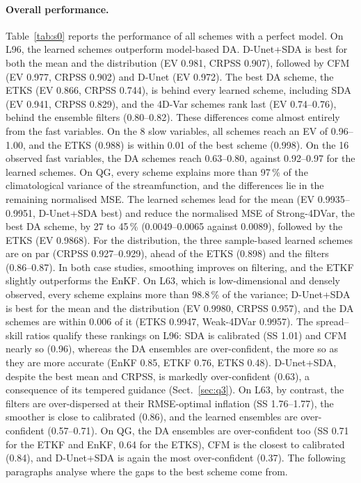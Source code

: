\paragraph{Overall performance.}
Table~\ref{tab:s0} reports the performance of all schemes with a perfect model. On L96,
the learned schemes outperform model-based DA. D-Unet+SDA is best for both the mean and
the distribution (EV 0.981, CRPSS 0.907), followed by CFM (EV 0.977, CRPSS 0.902) and
D-Unet (EV 0.972). The best DA scheme, the ETKS (EV 0.866, CRPSS 0.744), is behind
every learned scheme, including SDA (EV 0.941, CRPSS 0.829), and the 4D-Var schemes rank
last (EV 0.74--0.76), behind the ensemble filters (0.80--0.82). These differences come
almost entirely from the fast variables. On the 8 slow variables, all schemes reach an
EV of 0.96--1.00, and the ETKS (0.988) is within 0.01 of the best scheme (0.998). On the
16 observed fast variables, the DA schemes reach 0.63--0.80, against 0.92--0.97 for the
learned schemes. On
QG, every scheme explains more than 97\,\% of the climatological variance of the
streamfunction, and the differences lie in the remaining normalised MSE. The learned schemes
lead for the mean (EV 0.9935--0.9951, D-Unet+SDA best) and reduce the normalised MSE of
Strong-4DVar, the best DA scheme, by 27 to 45\,\% (0.0049--0.0065 against 0.0089), followed by
the ETKS (EV 0.9868). For the distribution, the three sample-based learned schemes are on par (CRPSS
0.927--0.929), ahead of the ETKS (0.898) and the filters (0.86--0.87). In both case studies, smoothing improves on
filtering, and the ETKF slightly outperforms the EnKF. On L63, which is low-dimensional and
densely observed, every scheme explains more than 98.8\,\% of the variance; D-Unet+SDA is best
for the mean and the distribution (EV 0.9980, CRPSS 0.957), and the DA schemes are within 0.006
of it (ETKS 0.9947, Weak-4DVar 0.9957). The spread--skill ratios qualify these rankings on L96:
SDA is calibrated (SS 1.01) and CFM nearly so (0.96), whereas the DA ensembles are
over-confident, the more so as they are more accurate (EnKF 0.85, ETKF 0.76, ETKS 0.48).
D-Unet+SDA, despite the best mean and CRPSS, is markedly over-confident (0.63), a consequence of its tempered guidance (Sect.~\ref{sec:q3}). On L63, by
contrast, the filters are over-dispersed at their RMSE-optimal inflation (SS 1.76--1.77), the
smoother is close to calibrated (0.86), and the learned ensembles are over-confident
(0.57--0.71).
On QG, the DA ensembles are over-confident too (SS 0.71 for the ETKF and EnKF, 0.64 for the
ETKS), CFM is the closest to calibrated (0.84), and D-Unet+SDA is again the most
over-confident (0.37). The following paragraphs analyse
where the gaps to the best scheme come from.

